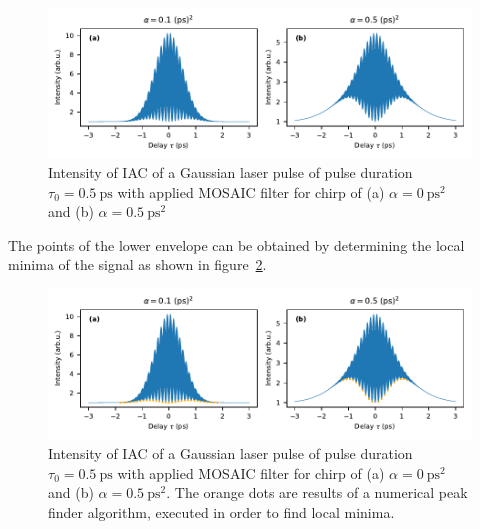 \begin{figure}[H]
	\centering
	\includegraphics[width=\linewidth]{figures/chirp/plots/mosaic_chirped_laser_pulse}
	\caption{Intensity of IAC of a Gaussian laser pulse of pulse duration $\tau_0=\SI{0.5}{\pico \second}$ with applied MOSAIC filter for chirp of (a) $\alpha = \SI{0}{\pico \second \squared}$ and (b) $\alpha = \SI{0.5}{\pico \second \squared}$}
	\label{fig:mosaicchirpedlaserpulse}
\end{figure}

The points of the lower envelope can be obtained by determining the local minima of the signal as shown in figure~\ref{fig:mosaicchirpedlaserpulsefindenvelope}.

\begin{figure}[H]
	\centering
	\includegraphics[width=\linewidth]{figures/chirp/plots/mosaic_chirped_laser_pulse_find_envelope}
	\caption{Intensity of IAC of a Gaussian laser pulse of pulse duration $\tau_0=\SI{0.5}{\pico \second}$ with applied MOSAIC filter for chirp of (a) $\alpha = \SI{0}{\pico \second \squared}$ and (b) $\alpha = \SI{0.5}{\pico \second \squared}$.
	The orange dots are results of a numerical peak finder algorithm, executed in order to find local minima.}
	\label{fig:mosaicchirpedlaserpulsefindenvelope}
\end{figure}


